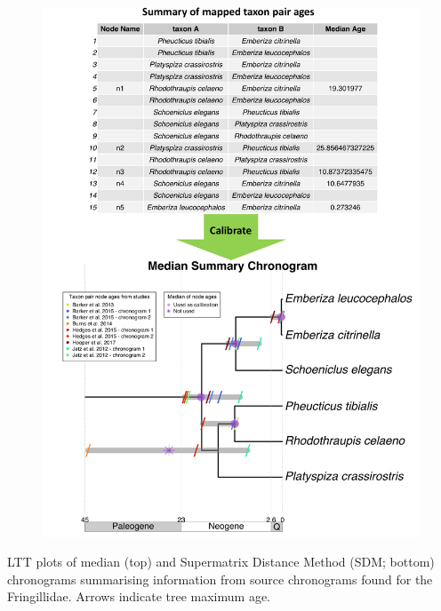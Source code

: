 \documentclass[
  english,
  man]{apa6}
\begin{document}
\begin{figure}[!h]
\includegraphics{../figures/figure2/figure2-2.pdf}
\caption{}
\label{fig:summaries}
\end{figure}
LTT plots of median (top) and Supermatrix Distance Method (SDM; bottom) chronograms summarising information from source chronograms found for the Fringillidae. Arrows indicate tree maximum age.
\newpage
\end{document}
